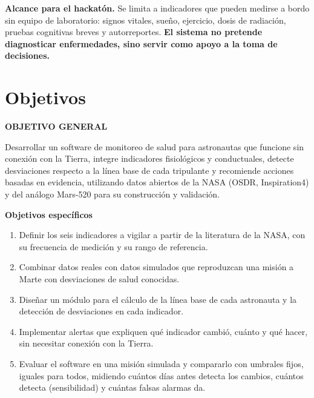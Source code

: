 \documentclass[11pt,a4paper]{article}
\begin{document}
\begin{notebox}
\textbf{Alcance para el hackatón.} Se limita a indicadores que pueden medirse a bordo sin equipo de laboratorio: signos vitales, sueño, ejercicio, dosis de radiación, pruebas cognitivas breves y autorreportes. \textbf{El sistema no pretende diagnosticar enfermedades, sino servir como apoyo a la toma de decisiones.}
\end{notebox}

\section{Objetivos}

\begin{tcolorbox}[enhanced, colback=teallight, colframe=teallight, arc=3pt, boxrule=0pt, left=12pt, right=12pt, top=10pt, bottom=10pt]
{\sffamily\bfseries\color{teal}OBJETIVO GENERAL}\par\vspace{0.3em}
Desarrollar un software de monitoreo de salud para astronautas que funcione sin conexión con la Tierra, integre indicadores fisiológicos y conductuales, detecte desviaciones respecto a la línea base de cada tripulante y recomiende acciones basadas en evidencia, utilizando datos abiertos de la NASA (OSDR, Inspiration4) y del análogo Mars-520 para su construcción y validación.
\end{tcolorbox}

{\sffamily\bfseries\color{navy}Objetivos específicos}
\begin{enumerate}
  \item Definir los seis indicadores a vigilar a partir de la literatura de la NASA, con su frecuencia de medición y su rango de referencia.
  \item Combinar datos reales con datos simulados que reproduzcan una misión a Marte con desviaciones de salud conocidas.
  \item Diseñar un módulo para el cálculo de la línea base de cada astronauta y la detección de desviaciones en cada indicador.
  \item Implementar alertas que expliquen qué indicador cambió, cuánto y qué hacer, sin necesitar conexión con la Tierra.
  \item Evaluar el software en una misión simulada y compararlo con umbrales fijos, iguales para todos, midiendo cuántos días antes detecta los cambios, cuántos detecta (sensibilidad) y cuántas falsas alarmas da.
\end{enumerate}
\end{document}
